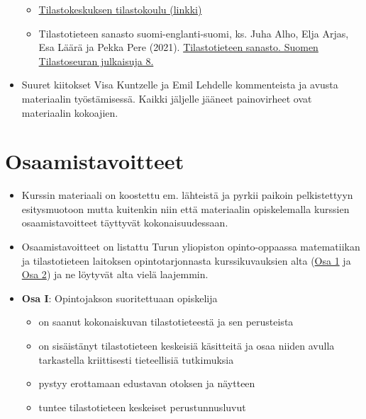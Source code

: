 \documentclass[
]{book}
\providecommand{\tightlist}{%
  \setlength{\itemsep}{0pt}\setlength{\parskip}{0pt}}
\begin{document}
\begin{itemize}
  \begin{itemize}
  \tightlist
  \item
    \href{https://tilastokoulu.stat.fi/verkkokoulu_v2.xql?course_id=tkoulu_tilaj\&lesson_id=1\&subject_id=0\&page_type=sisalto}{Tilastokeskuksen tilastokoulu (linkki)}
  \item
    Tilastotieteen sanasto suomi-englanti-suomi, ks. Juha Alho, Elja Arjas, Esa Läärä ja Pekka Pere (2021). \href{https://tilastoseura.fi/}{Tilastotieteen sanasto. Suomen Tilastoseuran julkaisuja 8.}
  \end{itemize}
\item
  Suuret kiitokset Visa Kuntzelle ja Emil Lehdelle kommenteista ja avusta materiaalin työstämisessä. Kaikki jäljelle jääneet painovirheet ovat materiaalin kokoajien.
\end{itemize}

\hypertarget{osaamistavoitteet}{%
\chapter*{Osaamistavoitteet}\label{osaamistavoitteet}}

\begin{itemize}
\item
  Kurssin materiaali on koostettu em. lähteistä ja pyrkii paikoin pelkistettyyn esitysmuotoon mutta kuitenkin niin että materiaalin opiskelemalla kurssien osaamistavoitteet täyttyvät kokonaisuudessaan.
\item
  Osaamistavoitteet on listattu Turun yliopiston opinto-oppaassa matematiikan ja tilastotieteen laitoksen opintotarjonnasta kurssikuvauksien alta (\href{https://opas.peppi.utu.fi/fi/opintojakso/TILM3712/102471?period=2024-2027}{Osa 1} ja \href{https://opas.peppi.utu.fi/fi/opintojakso/TILM3713/102472?period=2024-2027}{Osa 2}) ja ne löytyvät alta vielä laajemmin.
\item
  \textbf{Osa I}: Opintojakson suoritettuaan opiskelija

  \begin{itemize}
  \tightlist
  \item
    on saanut kokonaiskuvan tilastotieteestä ja sen perusteista\\
  \item
    on sisäistänyt tilastotieteen keskeisiä käsitteitä ja osaa niiden avulla tarkastella kriittisesti tieteellisiä tutkimuksia\\
  \item
    pystyy erottamaan edustavan otoksen ja näytteen\\
  \item
    tuntee tilastotieteen keskeiset perustunnusluvut
  \end{itemize}
\end{itemize}
\end{document}
